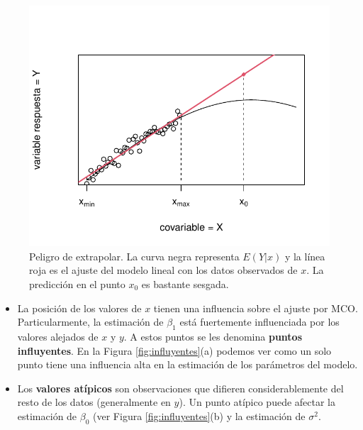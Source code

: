 \documentclass[
]{article}
\begin{document}
\begin{figure}

{\centering \includegraphics{MLGI_files/figure-latex/extrapolacion-1} 

}

\caption{Peligro de extrapolar. La curva negra representa $E(Y|x)$ y la línea roja es el ajuste del modelo lineal con los datos observados de $x$. La predicción en el punto $x_{0}$ es bastante sesgada.}\label{fig:extrapolacion}
\end{figure}

\begin{itemize}
\item
  La posición de los valores de \(x\) tienen una influencia sobre el ajuste por MCO. Particularmente, la estimación de \(\beta_{1}\) está fuertemente influenciada por los valores alejados de \(x\) y \(y\). A estos puntos se les denomina \textbf{puntos influyentes}. En la Figura \ref{fig:influyentes}(a) podemos ver como un solo punto tiene una influencia alta en la estimación de los parámetros del modelo.
\item
  Los \textbf{valores atípicos} son observaciones que difieren considerablemente del resto de los datos (generalmente en \(y\)). Un punto atípico puede afectar la estimación de \(\beta_{0}\) (ver Figura \ref{fig:influyentes}(b) y la estimación de \(\sigma^{2}\).
\end{itemize}
\end{document}
